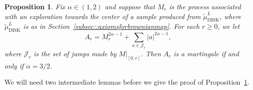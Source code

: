 \documentclass[JEP,XML,SOM,Unicode]{cedram}
\let\mathcal\mathscr
\theoremstyle{plain}
\numberwithin{theorem}{section}
\newtheorem{proposition}[theorem]{Proposition}
\theoremstyle{definition}
\newcommand{\CJ}{{\mathcal J}}
\newcommand{\tmudl}{\wt{\mu}_{\mathrm{DISK}}^L}
\let\wt\widetilde
\begin{document}
\label{subsec::martingale32}

\begin{proposition}
\label{prop::centermartingale}
Fix $\alpha \in (1,2)$ and suppose that $M_r$ is the process associated with an exploration towards the center of a sample produced from $\tmudl$, where $\tmudl$ is as in Section~\ref{subsec::axiomsforbrownianmap}. For each $r \geq 0$, we let
\begin{equation}
\label{eqn::atmartingale}
A_r = M_r^{2\alpha - 1} + \sum_{a \in \CJ_r} |a|^{2\alpha-1},
\end{equation}
where $\CJ_r$ is the set of jumps made by $M|_{[0,r]}$. Then $A_r$ is a martingale if and only if $\alpha = 3/2$.
\end{proposition}

We will need two intermediate lemmas before we give the proof of Proposition~\ref{prop::centermartingale}.
\end{document}
